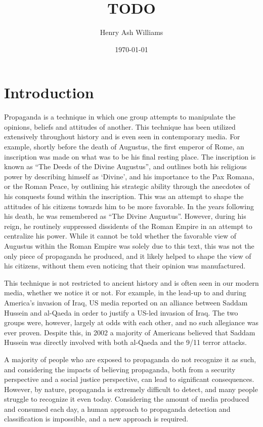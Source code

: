 \documentclass[twocolumn]{article}
\title{TODO}
\author{Henry Ash Williams}
\date{\today}
\begin{document}
\maketitle

\tableofcontents

\section{Introduction}

Propaganda is a technique in which one group attempts to manipulate the opinions, beliefs and attitudes of another. This technique has been utilized extensively throughout history and is even seen in contemporary media. For example, shortly before the death of Augustus, the first emperor of Rome, an inscription was made on what was to be his final resting place. The inscription is known as ``The Deeds of the Divine Augustus'', and outlines both his religious power by describing himself as `Divine', and his importance to the Pax Romana, or the Roman Peace, by outlining his strategic ability through the anecdotes of his conquests found within the inscription. This was an attempt to shape the attitudes of his citizens towards him to be more favorable. In the years following his death, he was remembered as ``The Divine Augustus''. However, during his reign, he routinely suppressed dissidents of the Roman Empire in an attempt to centralize his power. While it cannot be told whether the favorable view of Augustus within the Roman Empire was solely due to this text, this was not the only piece of propaganda he produced, and it likely helped to shape the view of his citizens, without them even noticing that their opinion was manufactured. 

This technique is not restricted to ancient history and is often seen in our modern media, whether we notice it or not. For example, in the lead-up to and during America's invasion of Iraq, US media reported on an alliance between Saddam Hussein and al-Qaeda in order to justify a US-led invasion of Iraq. The two groups were, however, largely at odds with each other, and no such allegiance was ever proven. Despite this, in 2002 a majority of Americans believed that Saddam Hussein was directly involved with both al-Qaeda and the 9/11 terror attacks. 

A majority of people who are exposed to propaganda do not recognize it as such, and considering the impacts of believing propaganda, both from a security perspective and a social justice perspective, can lead to significant consequences. However, by nature, propaganda is extremely difficult to detect, and many people struggle to recognize it even today. Considering the amount of media produced and consumed each day, a human approach to propaganda detection and classification is impossible, and a new approach is required. 
\end{document}

